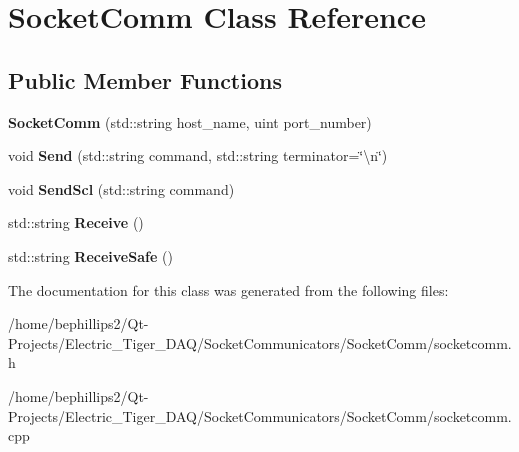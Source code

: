 \hypertarget{class_socket_comm}{}\section{Socket\+Comm Class Reference}
\label{class_socket_comm}
\subsection*{Public Member Functions}
\begin{DoxyCompactItemize}
\item 
{\bfseries Socket\+Comm} (std\+::string host\+\_\+name, uint port\+\_\+number)\hypertarget{class_socket_comm_a91848bdb00c5e2fa1d83bfabf2e83e23}{}\label{class_socket_comm_a91848bdb00c5e2fa1d83bfabf2e83e23}

\item 
void {\bfseries Send} (std\+::string command, std\+::string terminator=\char`\"{}\textbackslash{}n\char`\"{})\hypertarget{class_socket_comm_ad76f9593ad58c8899878d2b08ac61266}{}\label{class_socket_comm_ad76f9593ad58c8899878d2b08ac61266}

\item 
void {\bfseries Send\+Scl} (std\+::string command)\hypertarget{class_socket_comm_a9cda97b2727f4a47ef5f7d728737521b}{}\label{class_socket_comm_a9cda97b2727f4a47ef5f7d728737521b}

\item 
std\+::string {\bfseries Receive} ()\hypertarget{class_socket_comm_a854e742d1c9f998f7f0981fe3c77c84e}{}\label{class_socket_comm_a854e742d1c9f998f7f0981fe3c77c84e}

\item 
std\+::string {\bfseries Receive\+Safe} ()\hypertarget{class_socket_comm_a9c09a1bf47807b3465944a5555a61cec}{}\label{class_socket_comm_a9c09a1bf47807b3465944a5555a61cec}

\end{DoxyCompactItemize}


The documentation for this class was generated from the following files\+:\begin{DoxyCompactItemize}
\item 
/home/bephillips2/\+Qt-\/\+Projects/\+Electric\+\_\+\+Tiger\+\_\+\+D\+A\+Q/\+Socket\+Communicators/\+Socket\+Comm/socketcomm.\+h\item 
/home/bephillips2/\+Qt-\/\+Projects/\+Electric\+\_\+\+Tiger\+\_\+\+D\+A\+Q/\+Socket\+Communicators/\+Socket\+Comm/socketcomm.\+cpp\end{DoxyCompactItemize}
